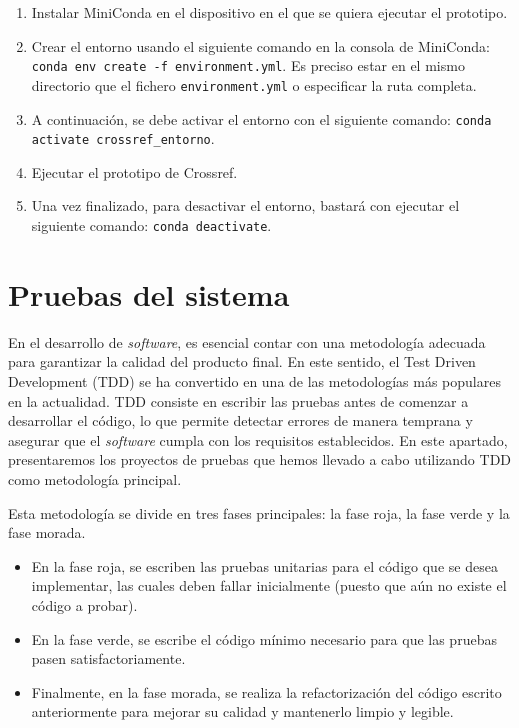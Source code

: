 \begin{enumerate}
    \item Instalar MiniConda en el dispositivo en el que se quiera ejecutar el prototipo.
    \item Crear el entorno usando el siguiente comando en la consola de MiniConda: \verb|conda env create -f environment.yml|. Es preciso estar en el mismo directorio que el fichero \texttt{environment.yml} o especificar la ruta completa.
    \item A continuación, se debe activar el entorno con el siguiente comando: \verb|conda activate crossref_entorno|. 
    \item Ejecutar el prototipo de Crossref.
    \item Una vez finalizado, para desactivar el entorno, bastará con ejecutar el siguiente comando: \verb|conda deactivate|. 
\end{enumerate}


\newpage
\section{Pruebas del sistema}

En el desarrollo de \textit{software}, es esencial contar con una metodología adecuada para garantizar la calidad del producto final. En este sentido, el Test Driven Development (TDD) se ha convertido en una de las metodologías más populares en la actualidad. TDD consiste en escribir las pruebas antes de comenzar a desarrollar el código, lo que permite detectar errores de manera temprana y asegurar que el \textit{software} cumpla con los requisitos establecidos. En este apartado, presentaremos los proyectos de pruebas que hemos llevado a cabo utilizando TDD como metodología principal.

Esta metodología se divide en tres fases principales: la fase roja, la fase verde y la fase morada. 
\begin{itemize}
    \item En la fase roja, se escriben las pruebas unitarias para el código que se desea implementar, las cuales deben fallar inicialmente (puesto que aún no existe el código a probar). 
    \item En la fase verde, se escribe el código mínimo necesario para que las pruebas pasen satisfactoriamente.
    \item Finalmente, en la fase morada, se realiza la refactorización del código escrito anteriormente para mejorar su calidad y mantenerlo limpio y legible.
\end{itemize}


